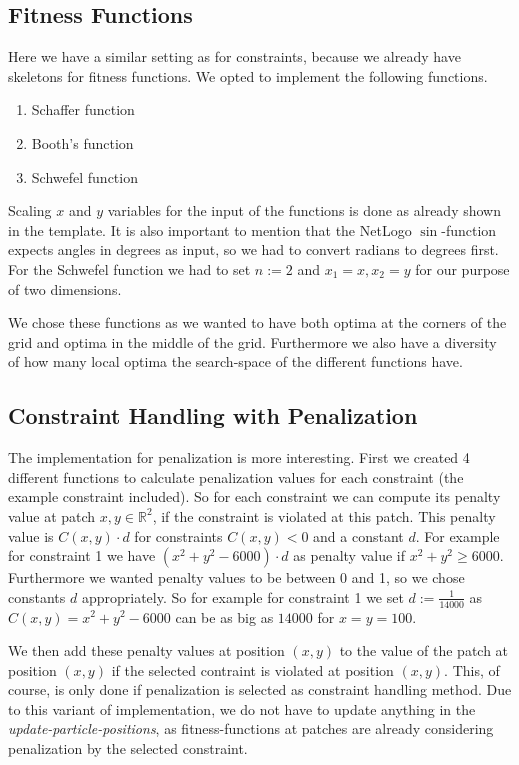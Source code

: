 \documentclass[12pt]{article}
\begin{document}
\subsection{Fitness Functions}
Here we have a similar setting as for constraints, because we already have skeletons for fitness functions.
We opted to implement the following functions.
\begin{enumerate}
        \item Schaffer function
        \item Booth's function
        \item Schwefel function
\end{enumerate}
Scaling $x$ and $y$ variables for the input of the functions is done as already shown in the template.
It is also important to mention that the NetLogo $\sin$-function expects angles in degrees as input, so we had to convert radians to degrees first.
For the Schwefel function we had to set $n:=2$ and $x_1=x,x_2=y$ for our purpose of two dimensions.

We chose these functions as we wanted to have both optima at the corners of the grid and optima in the middle of the grid.
Furthermore we also have a diversity of how many local optima the search-space of the different functions have.
\subsection{Constraint Handling with Penalization}
The implementation for penalization is more interesting.
First we created 4 different functions to calculate penalization values for each constraint (the example constraint included).
So for each constraint we can compute its penalty value at patch $x,y\in\mathbb{R}^2$, if the constraint is violated at this patch.
This penalty value is $C(x,y)\cdot d$ for constraints $C(x,y)<0$ and a constant $d$.
For example for constraint 1 we have $(x^2+y^2-6000)\cdot d$ as penalty value if $x^2+y^2\ge 6000$.
Furthermore we wanted penalty values to be between 0 and 1, so we chose constants $d$ appropriately.
So for example for constraint 1 we set $d:=\frac{1}{14000}$ as $C(x,y)=x^2+y^2-6000$ can be as big as $14000$ for $x=y=100$.

We then add these penalty values at position $(x,y)$ to the value of the patch at position $(x,y)$ if the selected contraint is violated at position $(x,y)$.
This, of course, is only done if penalization is selected as constraint handling method.
Due to this variant of implementation, we do not have to update anything in the \textit{update-particle-positions}, as fitness-functions at patches are already considering penalization by the selected constraint.
\end{document}
